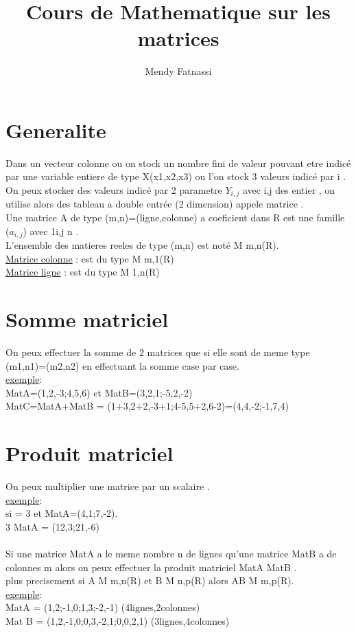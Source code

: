 \documentclass[a4paper,8pt,openany]{book}
\author{Mendy Fatnassi}
\title{Cours de Mathematique sur les matrices}
\begin{document}
\maketitle
\tableofcontents

\chapter{Generalite}
Dans un vecteur colonne ou on stock un nombre fini de valeur pouvant etre indicé par une variable entiere de type X(x1,x2,x3) ou l'on stock 3 valeurs indicé par i .\\
On peux stocker des valeurs indicé par 2 parametre $Y_{i,j}$ avec i,j des entier , on utilise alors des tableau a double entrée (2 dimension) appele matrice .\\
Une matrice A de type (m,n)=(ligne,colonne) a coeficient dans R est une famille ($a_{i,j}$) avec 1\leq i,j \leq n .\\
L'ensemble des matieres reeles de type (m,n) est noté M m,n(R).\\
\underline{Matrice colonne} : est du type M m,1(R)\\
\underline{Matrice ligne} : est du type M 1,n(R)\\

\chapter{Somme matriciel}
On peux effectuer la somme de 2 matrices que si elle sont de meme type (m1,n1)=(m2,n2) en effectuant la somme case par case.\\
\underline{exemple}:\\
MatA=(1,2,-3;4,5,6) et MatB=(3,2,1;-5,2,-2)\\
MatC=MatA+MatB = (1+3,2+2,-3+1;4-5,5+2,6-2)=(4,4,-2;-1,7,4)

\chapter{Produit matriciel}

On peux multiplier une matrice par un scalaire \lambda .\\
\underline{exemple}:\\
si \lambda = 3 et MatA=(4,1;7,-2). \\
3 \times MatA = (12,3;21,-6)\\
\\
Si une matrice MatA a le meme nombre n de lignes qu'une matrice MatB a de colonnes m alors on peux effectuer la produit matriciel MatA \times MatB .\\
plus precisement si A \in M m,n(R) et B \in M n,p(R) alors AB \in M m,p(R).\\
\underline{exemple}:\\
MatA = (1,2;-1,0;1,3;-2,-1) (4lignes,2colonnes)\\
Mat B = (1,2,-1,0;0,3,-2,1;0,0,2,1) (3lignes,4colonnes)\\
\end{document}
